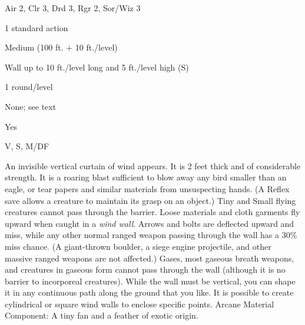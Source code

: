 
\begin{description*}
\item[Level:] Air 2, Clr 3, Drd 3, Rgr 2, Sor/Wiz 3
\item[Casting Time:] 1 standard action
\item[Range:] Medium (100 ft. + 10 ft./level)
\item[Effect:] Wall up to 10 ft./level long and 5 ft./level high (S)
\item[Duration:] 1 round/level
\item[Saving Throw:] None; see text
\item[Spell Resistance:] Yes
\item[Components:] V, S, M/DF
\end{description*}

An invisible vertical curtain of wind appears. It is 2 feet thick and of considerable
strength. It is a roaring blast sufficient to blow away any bird smaller than an
eagle, or tear papers and similar materials from unsuspecting hands. (A Reflex
save allows a creature to maintain its grasp on an object.) Tiny and Small flying
creatures cannot pass through the barrier. Loose materials and cloth garments fly
upward when caught in a \textit{wind wall}. Arrows and bolts are deflected upward
and miss, while any other normal ranged weapon passing through the wall has a 30\%
miss chance. (A giant-thrown boulder, a siege engine projectile, and other massive
ranged weapons are not affected.) Gases, most gaseous breath weapons, and creatures
in gaseous form cannot pass through the wall (although it is no barrier to incorporeal
creatures).
While the wall must be vertical, you can shape it in any continuous path along
the ground that you like. It is possible to create cylindrical or square wind walls
to enclose specific points.
Arcane Material Component: A tiny fan and a feather of exotic origin.